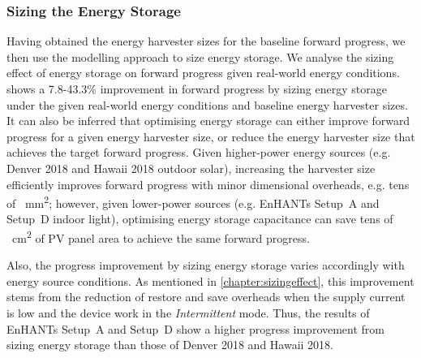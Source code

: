 \subsubsection{Sizing the Energy Storage}

Having obtained the energy harvester sizes for the baseline forward progress, we then use the modelling approach to size energy storage.
We analyse the sizing effect of energy storage on forward progress given real-world energy conditions.  shows a 7.8-43.3\% improvement in forward progress by sizing energy storage under the given real-world energy conditions and baseline energy harvester sizes. 
It can also be inferred that optimising energy storage can either improve forward progress for a given energy harvester size, or reduce the energy harvester size that achieves the target forward progress. 
Given higher-power energy sources (e.g. Denver 2018 and Hawaii 2018 outdoor solar), increasing the harvester size efficiently improves forward progress with minor dimensional overheads, e.g. tens of \SI{}{\square\milli\meter}; however, given lower-power sources (e.g. EnHANTs Setup~A and Setup~D indoor light), optimising energy storage capacitance can save tens of \SI{}{\square\centi\meter} of PV panel area to achieve the same forward progress.

Also, the progress improvement by sizing energy storage varies accordingly with energy source conditions. 
As mentioned in \cref{chapter:sizingeffect}, this improvement stems from the reduction of restore and save overheads when the supply current is low and the device work in the \textit{Intermittent} mode. 
Thus, the results of EnHANTs Setup~A and Setup~D show a higher progress improvement from sizing energy storage than those of Denver 2018 and Hawaii 2018. 

